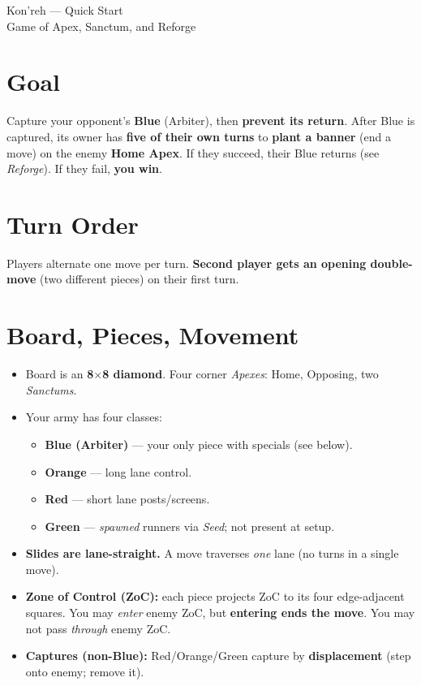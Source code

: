 \documentclass[11pt]{article}
\begin{document}

\begin{center}
{\LARGE Kon'reh --- Quick Start}\\
\vspace{0.25em}
{\small Game of Apex, Sanctum, and Reforge}
\end{center}

\section*{Goal}
Capture your opponent's \textbf{Blue} (Arbiter), then \textbf{prevent its return}. After Blue is captured, its owner has \textbf{five of their own turns} to \textbf{plant a banner} (end a move) on the enemy \textbf{Home Apex}. If they succeed, their Blue returns (see \emph{Reforge}). If they fail, \textbf{you win}. 

\section*{Turn Order}
Players alternate one move per turn. \textbf{Second player gets an opening double-move} (two different pieces) on their first turn.

\section*{Board, Pieces, Movement}
\begin{itemize}
  \item Board is an \textbf{8$\times$8 diamond}. Four corner \emph{Apexes}: Home, Opposing, two \emph{Sanctums}.
  \item Your army has four classes:
    \begin{itemize}
      \item \textbf{Blue (Arbiter)} --- your only piece with specials (see below).
      \item \textbf{Orange} --- long lane control.
      \item \textbf{Red} --- short lane posts/screens.
      \item \textbf{Green} --- \emph{spawned} runners via \emph{Seed}; not present at setup.
    \end{itemize}
  \item \textbf{Slides are lane-straight.} A move traverses \emph{one} lane (no turns in a single move).
  \item \textbf{Zone of Control (ZoC):} each piece projects ZoC to its four edge-adjacent squares. You may \emph{enter} enemy ZoC, but \textbf{entering ends the move}. You may not pass \emph{through} enemy ZoC.
  \item \textbf{Captures (non-Blue):} Red/Orange/Green capture by \textbf{displacement} (step onto enemy; remove it).
\end{itemize}
\end{document}
